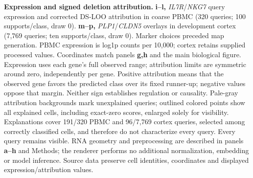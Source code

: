 \textbf{Expression and signed deletion attribution.}
\textbf{i--l,} \textit{IL7R}/\textit{NKG7} query expression and corrected DS-LOO attribution in coarse PBMC (320 queries; 100 supports/class, draw 0).
\textbf{m--p,} \textit{PLP1}/\textit{CLDN5} overlays in development cortex (7,769 queries; ten supports/class, draw 0). Marker choices preceded map generation. PBMC expression is log1p counts per 10,000; cortex retains supplied processed values. Coordinates match panels \textbf{g,h} and the main biological figure.
Expression uses each gene's full observed range; attribution limits are symmetric around zero, independently per gene. Positive attribution means that the observed gene favors the predicted class over its fixed runner-up; negative values oppose that margin. Neither sign establishes regulation or causality.
Pale-gray attribution backgrounds mark unexplained queries; outlined colored points show all explained cells, including exact-zero scores, enlarged solely for visibility. Explanations cover 191/320 PBMC and 96/7,769 cortex queries, selected among correctly classified cells, and therefore do not characterize every query. Every query remains visible. RNA geometry and preprocessing are described in panels \textbf{a--h} and Methods; the renderer performs no additional normalization, embedding or model inference. Source data preserve cell identities, coordinates and displayed expression/attribution values.
